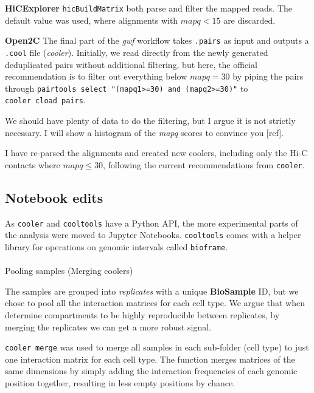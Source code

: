 \documentclass[
  11pt,
  a4paper,
]{scrbook}
\makeatletter
\let\oldparagraph\paragraph
\renewcommand{\paragraph}{
    \@ifstar
      \xxxParagraphStar
      \xxxParagraphNoStar
  }
\newcommand{\xxxParagraphStar}[1]{\oldparagraph*{#1}\mbox{}}
\newcommand{\xxxParagraphNoStar}[1]{\oldparagraph{#1}\mbox{}}
\let\oldemph\emph
\renewcommand\emph[1]{\oldemph{\color{gray}#1}}
\makeatother
\begin{document}
\textbf{HiCExplorer} \texttt{hicBuildMatrix} both parse and filter the
mapped reads. The default value was used, where alignments with
\(mapq < 15\) are discarded.

\textbf{Open2C} The final part of the \emph{gwf} workflow takes
\texttt{.pairs} as input and outputs a \texttt{.cool} file
(\emph{cooler}). Initially, we read directly from the newly generated
deduplicated pairs without additional filtering, but here, the official
recommendation is to filter out everything below \(mapq = 30\) by piping
the pairs through
\texttt{pairtools\ select\ "(mapq1\textgreater{}=30)\ and\ (mapq2\textgreater{}=30)"}
to \texttt{cooler\ cload\ pairs}.

We should have plenty of data to do the filtering, but I argue it is not
strictly necessary. I will show a histogram of the \emph{mapq} scores to
convince you {[}ref{]}.

I have re-parsed the alignments and created new coolers, including only
the Hi-C contacts where \(mapq \leq 30\), following the current
recommendations from \texttt{cooler}.

\subsection{Notebook edits}\label{notebook-edits}

As \texttt{cooler} and \texttt{cooltools} have a Python API, the more
experimental parts of the analysis were moved to Jupyter Notebooks.
\texttt{cooltools} comes with a helper library for operations on genomic
intervals called \texttt{bioframe}.

\paragraph{Pooling samples (Merging
coolers)}\label{pooling-samples-merging-coolers}

The samples are grouped into \emph{replicates} with a unique
\textbf{BioSample} ID, but we chose to pool all the interaction matrices
for each cell type. We argue that when \citet{wang_reprogramming_2019}
determine compartments to be highly reproducible between replicates, by
merging the replicates we can get a more robust signal.

\texttt{cooler\ merge} was used to merge all samples in each sub-folder
(cell type) to just one interaction matrix for each cell type. The
function merges matrices of the same dimensions by simply adding the
interaction frequencies of each genomic position together, resulting in
less empty positions by chance.
\end{document}
